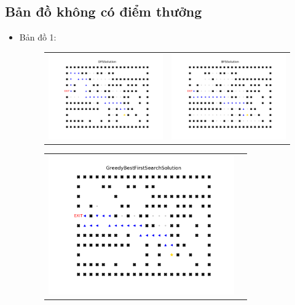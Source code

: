 \documentclass[11pt]{article} %
\begin{document}
\subsection{Bản đồ không có điểm thưởng}
\begin{itemize}
	\item Bản đồ 1:
		\begin{figure}[h] \label{123}
			\centering
			\begin{tabular}{cc}
				\includegraphics[width=8cm]{Figures/fg1_dfs.png} &
				\includegraphics[width=8cm]{Figures/fg1_bfs.png} \\
			\end{tabular}
		\end{figure}
		\begin{figure}[h] \label{fig:three-alternative-operations}
			\centering
			\begin{tabular}{cc}
				\includegraphics[width=8cm]{Figures/fg1_gbfs.png} &

\end{tabular}
\end{figure}
\end{itemize}
\end{document}
